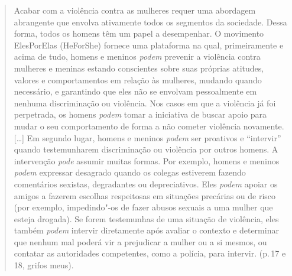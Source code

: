 \begin{quote}
Acabar com a violência contra as mulheres requer uma abordagem
abrangente que envolva ativamente todos os segmentos da sociedade. Dessa
forma, todos os homens têm um papel a desempenhar. O movimento
ElesPorElas (HeForShe) fornece uma plataforma na qual, primeiramente e
acima de tudo, homens e meninos \emph{podem} prevenir a violência
contra mulheres e meninas estando conscientes sobre suas próprias
atitudes, valores e comportamentos em relação às mulheres, mudando
quando necessário, e garantindo que eles não se envolvam pessoalmente em
nenhuma discriminação ou violência. Nos casos em que a violência já foi
perpetrada, os homens \emph{podem} tomar a iniciativa de buscar apoio
para mudar o seu comportamento de forma a não cometer violência
novamente. {[}\ldots{}{]} Em segundo lugar, homens e meninos \emph{podem}
ser proativos e ``intervir'' quando testemunharem discriminação ou
violência por outros homens. A intervenção \emph{pode} assumir muitas
formas. Por exemplo, homens e meninos \emph{podem} expressar desagrado
quando os colegas estiverem fazendo comentários sexistas, degradantes ou
depreciativos. Eles \emph{podem} apoiar os amigos a fazerem escolhas
respeitosas em situações precárias ou de risco (por exemplo,
impedindo"-os de fazer abusos sexuais a uma mulher que esteja drogada).
Se forem testemunhas de uma situação de violência, eles também
\emph{podem} intervir diretamente após avaliar o contexto e determinar
que nenhum mal poderá vir a prejudicar a mulher ou a si mesmos, ou
contatar as autoridades competentes, como a polícia, para intervir.
(p.\,17 e 18, grifos meus).
\end{quote}

